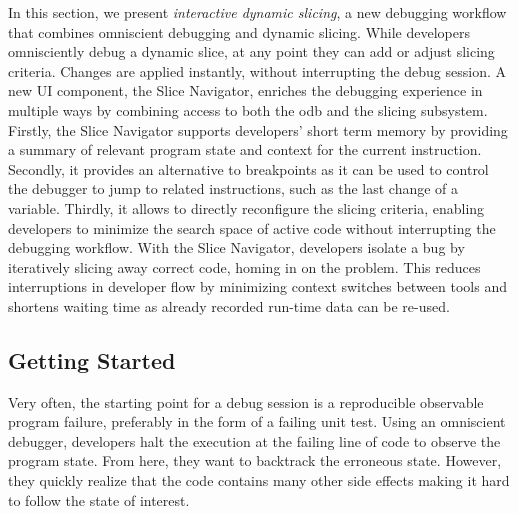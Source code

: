 \tmpStart

In this section, we present \emph{interactive dynamic slicing}, a new debugging workflow that combines omniscient debugging and dynamic slicing. 
While developers omnisciently debug a dynamic slice, at any point they can add or adjust slicing criteria. 
Changes are applied instantly, without interrupting the debug session. 
A new UI component, the Slice Navigator, enriches the debugging experience in multiple ways by combining access to both the \ac{odb} and the slicing subsystem.
Firstly, the Slice Navigator supports developers’ short term memory
by providing a summary of relevant program state and context for the current
instruction. Secondly, it provides an alternative to breakpoints as it can be used
to control the debugger to jump to related instructions, such as the last change of
a variable. Thirdly, it allows to directly reconfigure the slicing criteria, enabling
developers to minimize the search space of active code without interrupting the
debugging workflow.
With the Slice Navigator, developers isolate a bug by iteratively slicing away correct code, homing in on the problem. 
This reduces interruptions in developer flow by minimizing context switches between tools and shortens waiting time as already recorded run-time data can be re-used.

\tmpEnd
\tmpStart

\subsection{Getting Started}
\label{sec:example}

Very often, the starting point for a debug session is a reproducible observable program failure, preferably in the form of a failing unit test.
Using an omniscient debugger, developers halt the execution at the failing line of code to observe the program state.
From here, they want to backtrack the erroneous state.
However, they quickly realize that the code contains many other side effects making it hard to follow the state of interest.

